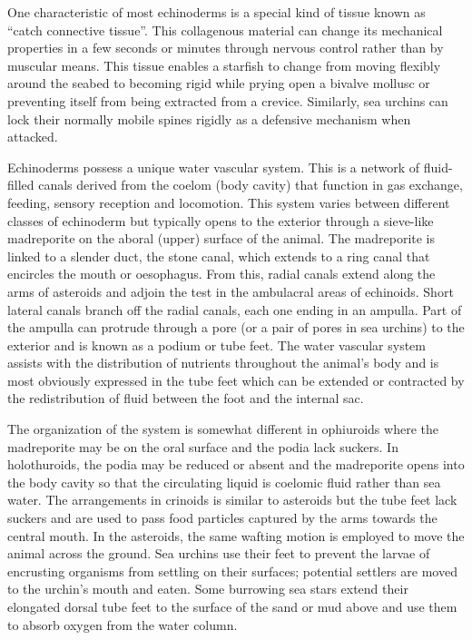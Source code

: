 One characteristic of most echinoderms is a special kind of tissue known as ``catch connective tissue''. This collagenous material can change its mechanical properties in a few seconds or minutes through nervous control rather than by muscular means. This tissue enables a starfish to change from moving flexibly around the seabed to becoming rigid while prying open a bivalve mollusc or preventing itself from being extracted from a crevice. Similarly, sea urchins can lock their normally mobile spines rigidly as a defensive mechanism when attacked.

Echinoderms possess a unique water vascular system. This is a network of fluid-filled canals derived from the coelom (body cavity) that function in gas exchange, feeding, sensory reception and locomotion. This system varies between different classes of echinoderm but typically opens to the exterior through a sieve-like madreporite on the aboral (upper) surface of the animal. The madreporite is linked to a slender duct, the stone canal, which extends to a ring canal that encircles the mouth or oesophagus. From this, radial canals extend along the arms of asteroids and adjoin the test in the ambulacral areas of echinoids. Short lateral canals branch off the radial canals, each one ending in an ampulla. Part of the ampulla can protrude through a pore (or a pair of pores in sea urchins) to the exterior and is known as a podium or tube feet. The water vascular system assists with the distribution of nutrients throughout the animal's body and is most obviously expressed in the tube feet which can be extended or contracted by the redistribution of fluid between the foot and the internal sac.

The organization of the system is somewhat different in ophiuroids where the madreporite may be on the oral surface and the podia lack suckers. In holothuroids, the podia may be reduced or absent and the madreporite opens into the body cavity so that the circulating liquid is coelomic fluid rather than sea water. The arrangements in crinoids is similar to asteroids but the tube feet lack suckers and are used to pass food particles captured by the arms towards the central mouth. In the asteroids, the same wafting motion is employed to move the animal across the ground. Sea urchins use their feet to prevent the larvae of encrusting organisms from settling on their surfaces; potential settlers are moved to the urchin's mouth and eaten. Some burrowing sea stars extend their elongated dorsal tube feet to the surface of the sand or mud above and use them to absorb oxygen from the water column.

